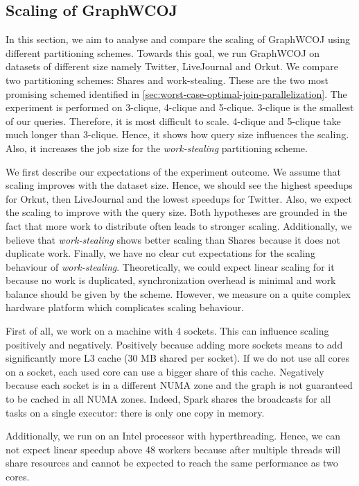 \subsection{Scaling of GraphWCOJ} \label{subsec:scaling-graphWCOJ}

In this section, we aim to analyse and compare the scaling of Graph\textsc{WCOJ} using different
partitioning schemes.
Towards this goal, we run Graph\textsc{WCOJ} on datasets of different size namely Twitter,
LiveJournal and Orkut.
We compare two partitioning schemes: Shares and work-stealing.
These are the two most promising schemed identified in \cref{sec:worst-case-optimal-join-parallelization}.
The experiment is performed on 3-clique, 4-clique and 5-clique.
3-clique is the smallest of our queries.
Therefore, it is most difficult to scale.
4-clique and 5-clique take much longer than 3-clique.
Hence, it shows how query size influences the scaling.
Also, it increases the job size for the \textit{work-stealing} partitioning scheme.

We first describe our expectations of the experiment outcome.
We assume that scaling improves with the dataset size.
Hence, we should see the highest speedups for Orkut, then LiveJournal and the lowest speedups for Twitter.
Also, we expect the scaling to improve with the query size.
Both hypotheses are grounded in the fact that more work to distribute often leads to stronger scaling.
Additionally, we believe that \textit{work-stealing} shows better scaling than Shares because it does not duplicate work.
Finally, we have no clear cut expectations for the scaling behaviour of \textit{work-stealing}.
Theoretically, we could expect linear scaling for it because no work is duplicated, synchronization overhead is minimal and
work balance should be given by the scheme.
However, we measure on a quite complex hardware platform which complicates scaling behaviour.

First of all, we work on a machine with 4 sockets.
This can influence scaling positively and negatively.
Positively because adding more sockets means to add significantly more L3 cache (30 MB shared per socket).
If we do not use all cores on a socket, each used core can use a bigger share of this cache.
Negatively because each socket is in a different NUMA zone and the graph is not guaranteed to be cached in all
NUMA zones.
Indeed, Spark shares the broadcasts for all tasks on a single executor:
there is only one copy in memory.

Additionally, we run on an Intel processor with hyperthreading.
Hence, we can not expect linear speedup above 48 workers because after multiple threads will share resources and cannot be
expected to reach the same performance as two cores.

